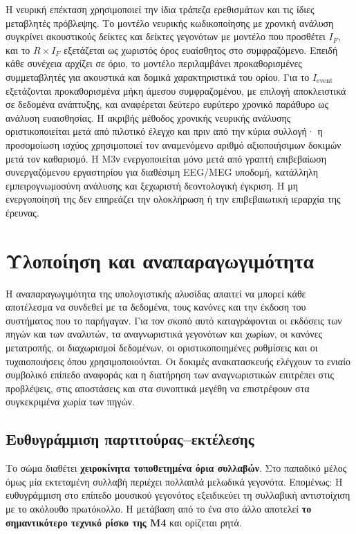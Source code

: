 \documentclass[11pt,a4paper]{article}
\begin{document}
Η νευρική επέκταση χρησιμοποιεί την ίδια τράπεζα ερεθισμάτων και τις ίδιες μεταβλητές πρόβλεψης. Το μοντέλο νευρικής κωδικοποίησης με χρονική ανάλυση συγκρίνει ακουστικούς δείκτες και δείκτες γεγονότων με μοντέλο που προσθέτει $I_F$, και το $R\times I_F$ εξετάζεται ως χωριστός όρος ευαίσθητος στο συμφραζόμενο. Επειδή κάθε συνέχεια αρχίζει σε όριο, το μοντέλο περιλαμβάνει προκαθορισμένες συμμεταβλητές για ακουστικά και δομικά χαρακτηριστικά του ορίου. Για το $I_{\mathrm{event}}$ εξετάζονται προκαθορισμένα μήκη άμεσου συμφραζομένου, με επιλογή αποκλειστικά σε δεδομένα ανάπτυξης, και αναφέρεται δεύτερο ευρύτερο χρονικό παράθυρο ως ανάλυση ευαισθησίας. Η ακριβής μέθοδος χρονικής νευρικής ανάλυσης οριστικοποιείται μετά από πιλοτικό έλεγχο και πριν από την κύρια συλλογή· η προσομοίωση ισχύος χρησιμοποιεί τον αναμενόμενο αριθμό αξιοποιήσιμων δοκιμών μετά τον καθαρισμό. Η M3ν ενεργοποιείται μόνο μετά από γραπτή επιβεβαίωση συνεργαζόμενου εργαστηρίου για διαθέσιμη EEG/MEG υποδομή, κατάλληλη εμπειρογνωμοσύνη ανάλυσης και ξεχωριστή δεοντολογική έγκριση. Η μη ενεργοποίησή της δεν επηρεάζει την ολοκλήρωση ή την επιβεβαιωτική ιεραρχία της έρευνας.

\section{Υλοποίηση και αναπαραγωγιμότητα}\label{app:impl}

Η αναπαραγωγιμότητα της υπολογιστικής αλυσίδας απαιτεί να μπορεί κάθε αποτέλεσμα να συνδεθεί με τα δεδομένα, τους κανόνες και την έκδοση του συστήματος που το παρήγαγαν. Για τον σκοπό αυτό καταγράφονται οι εκδόσεις των πηγών και των αναλυτών, τα αναγνωριστικά γεγονότων και χωρίων, οι κανόνες μετατροπής, οι διαχωρισμοί δεδομένων, οι οριστικοποιημένες ρυθμίσεις και οι τυχαιοποιήσεις όπου χρησιμοποιούνται. Οι δοκιμές ανακατασκευής ελέγχουν το ενιαίο συμβολικό επίπεδο αναφοράς και η διατήρηση των αναγνωριστικών επιτρέπει στις προβλέψεις, στις αποστάσεις και στα συνοπτικά μεγέθη να επιστρέφουν στα συγκεκριμένα χωρία των πηγών.

\subsection{Ευθυγράμμιση παρτιτούρας--εκτέλεσης}\label{app:impl-align}

Το σώμα διαθέτει \textbf{χειροκίνητα τοποθετημένα όρια συλλαβών}. Στο παπαδικό μέλος όμως μία εκτεταμένη συλλαβή περιέχει πολλαπλά μελωδικά γεγονότα. Επομένως:
Η ευθυγράμμιση στο επίπεδο μουσικού γεγονότος εξειδικεύει τη συλλαβική αντιστοίχιση με το ακόλουθο πρωτόκολλο.
Η μετάβαση από το ένα στο άλλο αποτελεί \textbf{το σημαντικότερο τεχνικό ρίσκο της M4} και ορίζεται ρητά.
\end{document}

